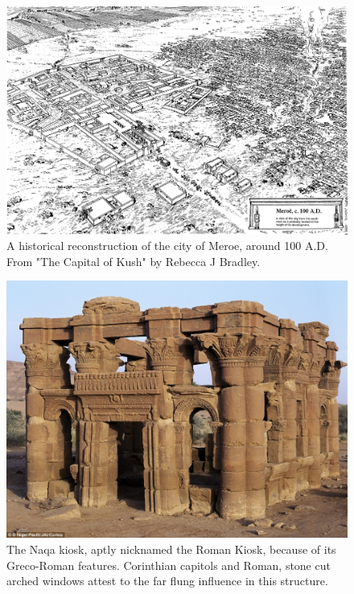 \documentclass[a4paper,12pt]{scrreprt}
\begin{document}
\begin{figure}[H]
	\centering
	\includegraphics[width=\textwidth]{img/13b_Reconstruction_of_Meroe_from_The_Capital_of_Kush_by_Rebecca_J_Bradley}
	\caption{A historical reconstruction of the city of Meroe, around 100 A.D. From "The Capital of Kush" by Rebecca J Bradley.}
\end{figure}

\begin{figure}[H]
	\centering
	\includegraphics[width=\textwidth]{img/roman_kiosk}
	\caption{The Naqa kiosk, aptly nicknamed the Roman Kiosk, because of its Greco-Roman features. Corinthian capitols and Roman, stone cut arched windows attest to the far flung influence in this structure.}
\end{figure}
\end{document}
